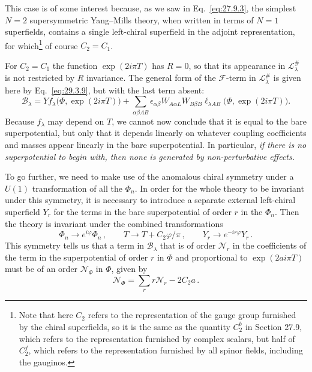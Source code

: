 This case is of some interest because, as we saw in
Eq.~\eqref{eq:27.9.3}, the simplest \(N=2\) supersymmetric Yang--Mills
theory, when written in terms of \(N=1\) superfields, contains a single
left-chiral superfield in the adjoint representation, for
which\footnote{Note that here \(C_2\) refers to the representation of the
gauge group furnished by the chiral superfields, so it is the same as the
quantity \(C_2^b\) in Section 27.9, which refers to the representation
furnished by complex scalars, but half of \(C_2^f\), which refers to the
representation furnished by all spinor fields, including the gauginos.}
of course \(C_2=C_1\).

For \(C_2=C_1\) the function \(\exp(2i\pi T)\) has \(R=0\), so that its
appearance in \(\mathcal{L}^{\#}_\lambda\) is not restricted by \(R\)
invariance. The general form of the \(\mathcal{F}\)-term in
\(\mathcal{L}^{\#}_\lambda\) is given here by Eq.~\eqref{eq:29.3.9}, but
with the last term absent:
\begin{equation}
  \mathcal{B}_\lambda
  =
  Yf_\lambda\bigl(\Phi,\exp(2i\pi T)\bigr)
  +\sum_{\alpha\beta AB}
  \epsilon_{\alpha\beta}W_{A\alpha L}W_{B\beta B}
  \ell_{\lambda AB}\bigl(\Phi,\exp(2i\pi T)\bigr).
  \tag{29.3.32}\label{eq:29.3.32}
\end{equation}
Because \(f_\lambda\) may depend on \(T\), we cannot now conclude that it
is equal to the bare superpotential, but only that it depends linearly on
whatever coupling coefficients and masses appear linearly in the bare
superpotential. In particular, \emph{if there is no superpotential to
begin with, then none is generated by non-perturbative effects.}

To go further, we need to make use of the anomalous chiral symmetry under a
\(U(1)\) transformation of all the \(\Phi_n\). In order for the whole
theory to be invariant under this symmetry, it is necessary to introduce a
separate external left-chiral superfield \(Y_r\) for the terms in the bare
superpotential of order \(r\) in the \(\Phi_n\). Then the theory is
invariant under the combined transformations
\begin{equation}
  \Phi_n\longrightarrow e^{i\varphi}\Phi_n\,,
  \qquad
  T\longrightarrow T+C_2\varphi/\pi\,,
  \qquad
  Y_r\longrightarrow e^{-ir\varphi}Y_r\,.
  \tag{29.3.33}\label{eq:29.3.33}
\end{equation}
This symmetry tells us that a term in \(\mathcal{B}_\lambda\) that is of
order \(\mathcal{N}_r\) in the coefficients of the term in the
superpotential of order \(r\) in \(\Phi\) and proportional to
\(\exp(2ai\pi T)\) must be of an order \(\mathcal{N}_\Phi\) in \(\Phi\),
given by
\begin{equation}
  \mathcal{N}_\Phi
  =
  \sum_r r\mathcal{N}_r-2C_2a\,.
  \tag{29.3.34}\label{eq:29.3.34}
\end{equation}

